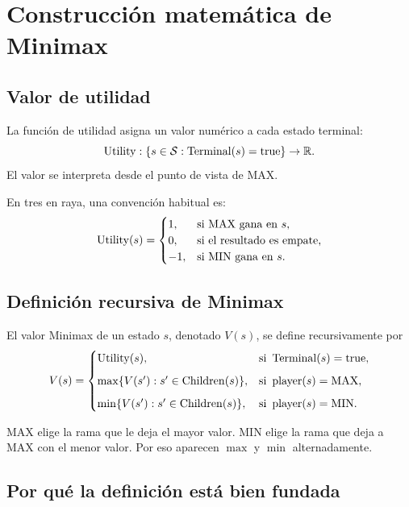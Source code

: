 \chapter{Construcción matemática de Minimax}

\section{Valor de utilidad}

\begin{definition}
La función de utilidad asigna un valor numérico a cada estado terminal:
\[
\operatorname{Utility}:\{s\in\mathcal{S}:\operatorname{Terminal}(s)=\mathrm{true}\}\to\mathbb{R}.
\]
El valor se interpreta desde el punto de vista de MAX.
\end{definition}

En tres en raya, una convención habitual es:
\[
\operatorname{Utility}(s)=
\begin{cases}
1, & \text{si MAX gana en }s,\\
0, & \text{si el resultado es empate,}\\
-1, & \text{si MIN gana en }s.
\end{cases}
\]

\section{Definición recursiva de Minimax}

\begin{definition}
El valor Minimax de un estado $s$, denotado $V(s)$, se define recursivamente por
\[
V(s)=
\begin{cases}
\operatorname{Utility}(s), & \text{si }\operatorname{Terminal}(s)=\mathrm{true},\\[2mm]
\max\{V(s'):s'\in\operatorname{Children}(s)\}, & \text{si }\operatorname{player}(s)=\mathrm{MAX},\\[2mm]
\min\{V(s'):s'\in\operatorname{Children}(s)\}, & \text{si }\operatorname{player}(s)=\mathrm{MIN}.
\end{cases}
\]
\end{definition}

\begin{intuitionbox}
MAX elige la rama que le deja el mayor valor. MIN elige la rama que deja a MAX con el menor valor. Por eso aparecen $\max$ y $\min$ alternadamente.
\end{intuitionbox}

\section{Por qué la definición está bien fundada}

